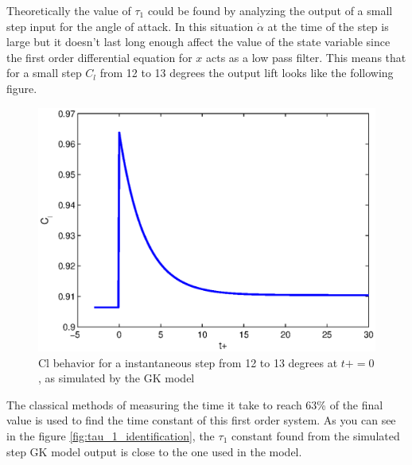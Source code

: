 \par Theoretically the value of $\tau_1$ could be found by analyzing the output of a small step input for the angle of attack.
In this situation $\dot{\alpha}$ at the time of the step is large but it doesn't last long enough affect the value of the state variable since the first order differential equation for $x$ acts as a low pass filter.
This means that for a small step $C_l$ from 12 to 13 degrees the output lift looks like the following figure.

\begin{figure}[h]
  \centering
  \includegraphics{./Figures/Cl_vs_tplus_step_12to13.eps}
  \caption{Cl behavior for a instantaneous step from 12 to 13 degrees at $t+=0$, as simulated by the GK model}
  \label{fig:Cl_for_alpha_step}
\end{figure}

\FloatBarrier

\par The classical methods of measuring the time it take to reach 63\% of the final value is used to find the time constant of this first order system.
As you can see in the figure \ref{fig:tau_1_identification}, the $\tau_1$ constant found from the simulated step GK model output is close to the one used in the model.

